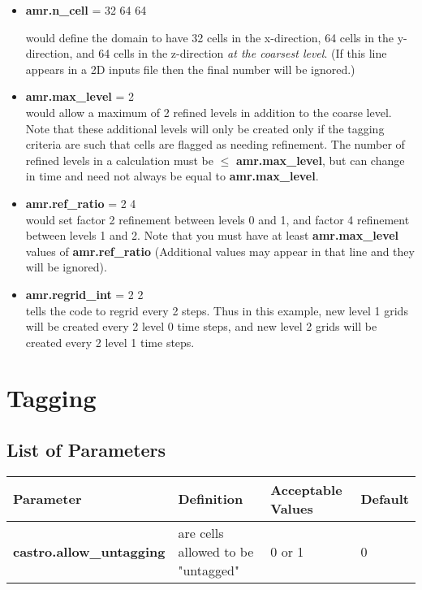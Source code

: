 \begin{itemize}

\item {\bf amr.n\_cell} = 32 64 64

would define the domain to have 32 cells in the x-direction, 64 cells in the y-direction, 
and 64 cells in the z-direction {\em{at the coarsest level}}. 
(If this line appears in a 2D inputs file then the final number will be ignored.)

\item {\bf amr.max\_level} = 2 \\ 
would allow a maximum  of 2 refined levels in addition to the coarse level.   
Note that these additional levels will only be created only if the tagging criteria 
are such that cells are flagged as needing refinement.  The number of refined levels 
in a calculation must be $\leq$ {\bf amr.max\_level}, but can change in time and need
not always be equal to {\bf amr.max\_level}.
 
\item {\bf amr.ref\_ratio} = 2 4 \\ 
would set factor 2 refinement between levels 0 and 1, and factor 4 refinement between levels 1 and 2. 
Note that you must have at least {\bf amr.max\_level} values of {\bf amr.ref\_ratio} 
(Additional values may appear in that line and they will be ignored).

\item {\bf amr.regrid\_int} = 2 2 \\
tells the code to regrid every 2 steps.  Thus in this example, new level 1 grids will be created every 2 level 0 time steps, and
new level 2 grids will be created every 2 level 1 time steps.

\end{itemize}

\section{Tagging}

\subsection{List of Parameters}

\begin{table*}[h]
\begin{scriptsize}
\begin{center}
\begin{tabular}{|l|l|l|l|} \hline
Parameter & Definition & Acceptable Values &Default\\
\hline
{\bf castro.allow\_untagging} & are cells allowed to be "untagged" & 0 or 1 & 0 \\
\hline
\end{tabular}
\label{Table:Tagging}
\end{center}
\end{scriptsize}
\end{table*}

